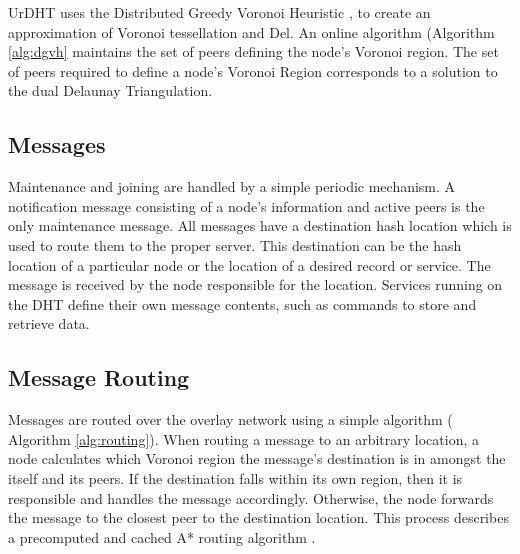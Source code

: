 UrDHT uses the Distributed Greedy Voronoi Heuristic \cite{dgvh}, to create an approximation of Voronoi tessellation and Del. 
An online algorithm (Algorithm \ref{alg:dgvh} maintains the set of peers defining the node's Voronoi region. The set of peers required to define a node's Voronoi Region corresponds to a solution to the dual Delaunay Triangulation.


%


\subsection{Messages}
Maintenance and joining are handled by a simple periodic mechanism. A notification message consisting of a node's information and active peers is the only maintenance message. All messages have a destination hash location which is used to route them to the proper server. This destination can be the hash location of a particular node or the location of a desired record or service.  The message is received by the node responsible for the location. Services running on the DHT define their own message contents, such as commands to store and retrieve data.

\subsection{Message Routing}
Messages are routed over the overlay network using a simple algorithm ( Algorithm \ref{alg:routing}). 
When routing a message to an arbitrary location, a node calculates which Voronoi region the message's destination is in amongst the itself and its peers. If the destination falls within its own region, then it is responsible and handles the message accordingly. Otherwise, the node forwards the message to the closest peer to the destination location. This process describes a precomputed and cached A* routing  algorithm \cite{astar} . 

